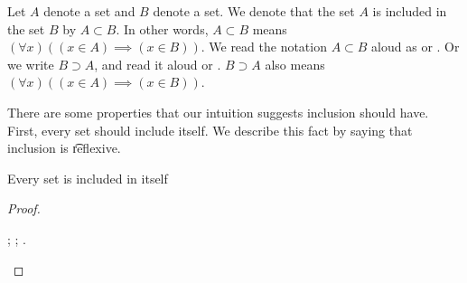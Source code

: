 %
%
%


Let $A$ denote a set and $B$ denote a set.
We denote that the set $A$ is included in the set $B$ by $A \subset B$.
In other words, $A \subset B$ means $(\forall x)((x \in A) \implies (x \in B))$.
We read the notation $A \subset B$ aloud as  or .
Or we write $B \supset A$, and read it aloud  or .
$B \supset A$ also means $(\forall x)((x \in A) \implies (x \in B))$.


There are some properties that our intuition suggests inclusion should have.
First, every set should include itself.
We describe this fact by saying that inclusion is \t{reflexive}.
\begin{proposition}[Reflexive]
  Every set is included in itself
\end{proposition}
\begin{proof}
\begin{caccount}
  ;
  ;
  .
\end{caccount}
\end{proof}

